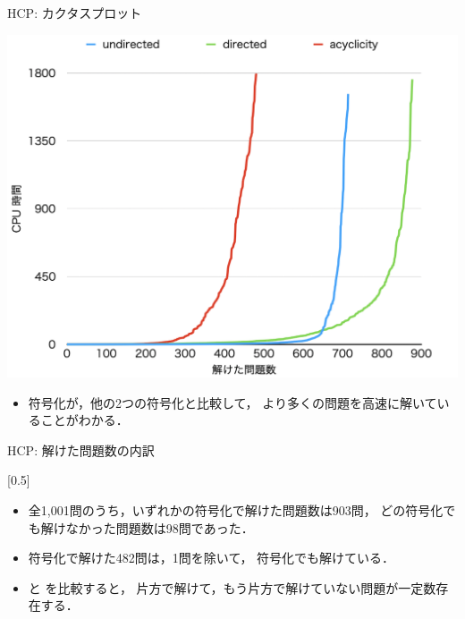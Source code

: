 \documentclass[dvipdfmx]{beamer}
\begin{document}
\begin{frame}{HCP: カクタスプロット}

\begin{center}
  \includegraphics[width=0.7\linewidth]{fig/cactus.png}
\end{center}

\begin{itemize}
\item {} 符号化が，他の2つの符号化と比較して，
  より多くの問題を高速に解いていることがわかる．
\end{itemize}
\end{frame}

\begin{frame}[shrink]{HCP: 解けた問題数の内訳}
  
\begin{center}
\scalebox{0.5}[0.5]{}
\end{center}
\vfill
\begin{itemize}
\item 全1,001問のうち，いずれかの符号化で解けた問題数は903問，
  どの符号化でも解けなかった問題数は98問であった．
\item {} 符号化で解けた482問は，1問を除いて，
   符号化でも解けている．
\item {} と  を比較すると，
  片方で解けて，もう片方で解けていない問題が一定数存在する．
\end{itemize}
\end{frame}
\end{document}

